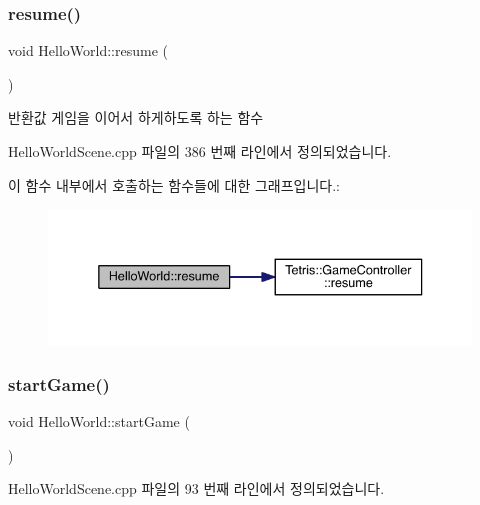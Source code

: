 \subsubsection{\texorpdfstring{resume()}{resume()}}
{\footnotesize\ttfamily void Hello\+World\+::resume (\begin{DoxyParamCaption}{ }\end{DoxyParamCaption})\hspace{0.3cm}{\ttfamily [protected]}}

\begin{DoxyReturn}{반환값}
게임을 이어서 하게하도록 하는 함수 
\end{DoxyReturn}


Hello\+World\+Scene.\+cpp 파일의 386 번째 라인에서 정의되었습니다.

이 함수 내부에서 호출하는 함수들에 대한 그래프입니다.\+:
\nopagebreak
\begin{figure}[H]
\begin{center}
\leavevmode
\includegraphics[width=336pt]{class_hello_world_ad72b45627fe36ea8cd04b9de431edc7f_cgraph}
\end{center}
\end{figure}
\mbox{\label{class_hello_world_aa4c36099096e160e3726819a2308dd04}} 
\subsubsection{\texorpdfstring{start\+Game()}{startGame()}}
{\footnotesize\ttfamily void Hello\+World\+::start\+Game (\begin{DoxyParamCaption}{ }\end{DoxyParamCaption})}



Hello\+World\+Scene.\+cpp 파일의 93 번째 라인에서 정의되었습니다.

